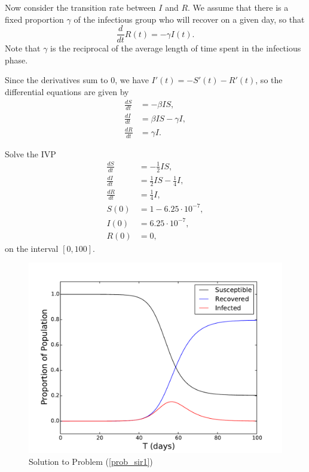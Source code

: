  Now consider the transition rate between $I$ and $R$.
We assume that there is a fixed proportion $\gamma$ of the infectious group who will recover on a given day, so that 
\[\frac{d}{dt}R(t) = -\gamma I(t).\]
Note that $\gamma$ is the reciprocal of the average length of time spent in the infectious phase.
 
Since the derivatives sum to $0$, we have $I'(t) = - S'(t) - R'(t)$, so the  differential equations are given by
\begin{align*}
\frac{dS}{dt} &=-\beta IS ,\\
\frac{dI}{dt} &= \beta I S-\gamma I,\\
\frac{dR}{dt} &=\gamma I.
\end{align*}

\begin{problem}
Solve the IVP
\begin{align*}
\frac{dS}{dt} &=-\frac{1}{2} IS ,\\
\frac{dI}{dt} &= \frac{1}{2} I S-\frac{1}{4} I, \\
\frac{dR}{dt} &=\frac{1}{4} I,\\
S(0) &= 1-6.25\cdot10^{-7},\\
I(0) &= 6.25\cdot10^{-7},\\
R(0) &=0,
\end{align*}
on the interval $[0,100]$. \label{prob_sir1}
\end{problem}

\begin{figure}[ht]
\centering
\includegraphics[width=\textwidth]{SIR1.pdf}
\caption{Solution to Problem (\ref{prob_sir1})}
\label{sir1}
\end{figure}

